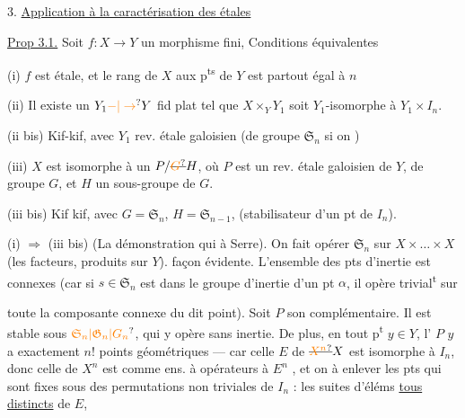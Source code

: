 3. \uline{Application à la caractérisation des   étales }  


\uline{Prop 3.1.} Soit $f:X\to Y$ un morphisme fini,  Conditions équivalentes

(i) $f$ est étale, et le rang de $X$ aux p\textsuperscript{ts} de $Y$ est partout égal à $n$

(ii) Il existe un $Y_1\unsure{-|\to}Y$ fid plat tel que $X\times_Y Y_1$ soit $Y_1$-isomorphe à $Y_1\times I_n$.

(ii bis) Kif-kif, avec $Y_1$  rev. étale galoisien (de groupe $\mathfrak S_n$ si on )

(iii) $X$ est isomorphe à un $P/\deleted{\unsure{G}}H$, où $P$ est un rev. étale galoisien de $Y$, de groupe $G$, et $H$ un sous-groupe de $G$.

(iii bis) Kif kif, avec $G=\mathfrak S_n$, $H=\mathfrak S_{n-1}$,  (stabilisateur d'un pt de $I_n$).


(i) $\Longrightarrow$ (iii bis) (La démonstration qui     à  Serre). On fait opérer $\mathfrak S_n$ sur $X\times\ldots\times X$ (les facteurs, produits sur $Y$). façon évidente. L'ensemble des pts d'inertie est   connexes (car si $s\in\mathfrak S_n$ est dans le groupe d'inertie d'un pt $\alpha$, il opère trivial\textsuperscript{t} sur


toute la composante connexe du dit point). Soit $P$ son complémentaire. Il est  stable sous $\unsure{\mathfrak S_n|\mathfrak G_n|G_n}$, qui y opère sans inertie. De plus, en tout p\textsuperscript{t} $y\in Y$, l' $P$  $y$ a exactement $n!$ points géométriques --- car  celle $E$ de $\deleted{\unsure{X^n}}X$ est isomorphe à $I_n$, donc celle de $X^n$ est   comme ens. à opérateurs à $E^n$ , et on  à enlever les pts qui sont fixes sous des permutations non triviales de $I_n$ :  les suites d'éléms \uline{tous} \uline{distincts} de $E$, 

